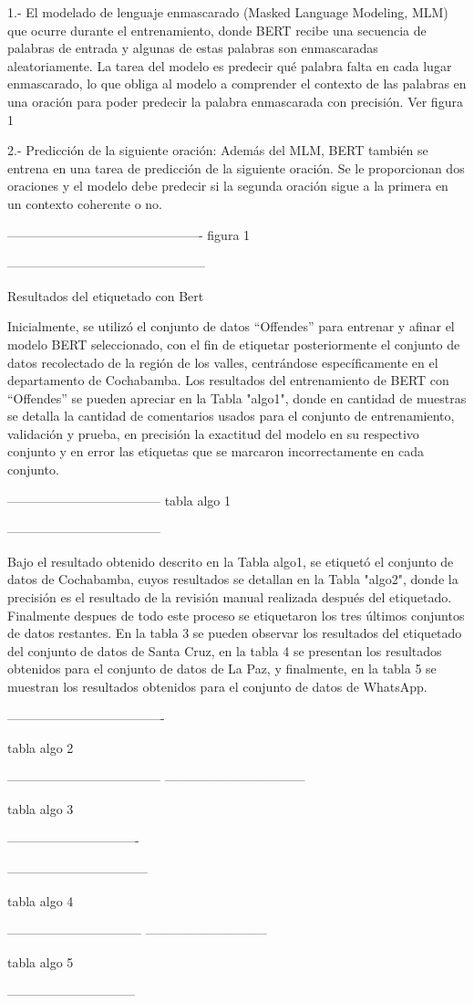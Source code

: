 1.- El modelado de lenguaje enmascarado (Masked Language Modeling, MLM) que ocurre durante el entrenamiento, donde BERT recibe una secuencia de palabras de entrada y algunas de estas palabras son enmascaradas aleatoriamente. La tarea del modelo es predecir qué palabra falta en cada lugar enmascarado, lo que obliga al modelo a comprender el contexto de las palabras en una oración para poder predecir la palabra enmascarada con precisión. Ver figura 1

2.- Predicción de la siguiente oración: Además del MLM, BERT también se entrena en una tarea de predicción de la siguiente oración. Se le proporcionan dos oraciones y el modelo debe predecir si la segunda oración sigue a la primera en un contexto coherente o no.


----------------------------------------------
figura 1

-----------------------------------------------

 Resultados del etiquetado con Bert

Inicialmente, se utilizó el conjunto de datos ``Offendes'' para entrenar y afinar  el modelo BERT seleccionado, con el fin de etiquetar posteriormente el conjunto de datos recolectado de la región de los valles, centrándose específicamente en el departamento de Cochabamba. Los resultados del entrenamiento de BERT con ``Offendes'' se pueden apreciar en la Tabla "algo1", donde en cantidad de muestras se detalla la cantidad de comentarios usados para el conjunto de entrenamiento, validación y prueba, en precisión la exactitud del modelo en su respectivo conjunto y en error las etiquetas que se marcaron incorrectamente en cada conjunto.

------------------------------------
tabla algo 1

------------------------------------

Bajo el resultado obtenido descrito en la Tabla algo1, se etiquetó el conjunto de datos de Cochabamba, cuyos resultados se detallan en la Tabla "algo2", donde la precisión es el resultado de la revisión manual realizada después del etiquetado. Finalmente despues de todo este proceso se etiquetaron los tres últimos conjuntos de datos restantes. En la tabla 3 se pueden observar los resultados del etiquetado del conjunto de datos de Santa Cruz, en la tabla 4 se presentan los resultados obtenidos para el conjunto de datos de La Paz, y finalmente, en la tabla 5 se muestran los resultados obtenidos para el conjunto de datos de WhatsApp.


-------------------------------------

tabla algo 2

------------------------------------
---------------------------------

tabla algo 3

-------------------------------

---------------------------------

tabla algo 4

--------------------------------
-----------------------------

tabla algo 5

------------------------------



